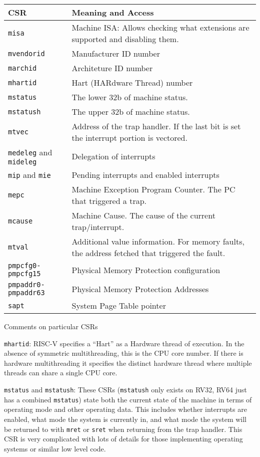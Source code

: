 \begin{tabular}{l|l}
  CSR & Meaning and Access \\ \hline
  \tt misa & Machine ISA: Allows checking what extensions are supported and disabling them. \\
  \tt mvendorid & Manufacturer ID number \\
  \tt marchid & Architeture ID number \\
  \tt mhartid & Hart (HARdware Thread) number \\
  \tt mstatus & The lower 32b of machine status. \\
  \tt mstatush & The upper 32b of machine status. \\
  \tt mtvec & Address of the trap handler.  If the last bit is set the interrupt portion is vectored. \\
  {\tt medeleg} and {\tt mideleg} & Delegation of interrupts \\
  {\tt mip} and {\tt mie} & Pending interrupts and enabled interrupts \\
  \tt mepc & Machine Exception Program Counter.  The PC that triggered a trap. \\
  \tt mcause & Machine Cause.  The cause of the current trap/interrupt. \\
  \tt mtval & Additional value information.  For memory faults, the address fetched that triggered the fault. \\

  \tt pmpcfg0-pmpcfg15 & Physical Memory Protection configuration \\
  \tt pmpaddr0-pmpaddr63 & Physical Memory Protection Addresses \\
  \tt sapt & System Page Table pointer \\
  
\end{tabular}

\vspace{0.2in}

Comments on particular CSRs

{\tt mhartid}: RISC-V specifies a ``Hart'' as a Hardware thread of
execution.  In the absence of symmetric multithreading, this is the
CPU core number.  If there is hardware multithreading it specifies the
distinct hardware thread where multiple threads can share a single CPU
core.

{\tt mstatus} and {\tt mstatush}: These CSRs ({\tt mstatush} only
exists on RV32, RV64 just has a combined {\tt mstatus}) state both the
current state of the machine in terms of operating mode and other
operating data.  This includes whether interrupts are enabled, what
mode the system is currently in, and what mode the system will be
returned to with {\tt mret} or {\tt sret} when returning from the trap
handler.  This CSR is very complicated with lots of details for those
implementing operating systems or similar low level code.

